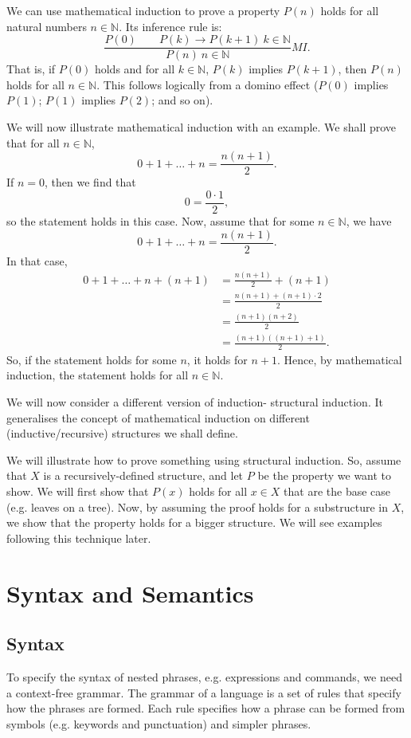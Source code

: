 \documentclass[a4paper, openany]{memoir}
\begin{document}
    We can use mathematical induction to prove a property $P(n)$ holds for all natural numbers $n \in \mathbb{N}$. Its inference rule is:
    \[\frac{P(0) \qquad P(k) \to P(k+1) \ k \in \mathbb{N}}{P(n) \ n \in \mathbb{N}} MI.\]
    That is, if $P(0)$ holds and for all $k \in \mathbb{N}$, $P(k)$ implies $P(k+1)$, then $P(n)$ holds for all $n \in \mathbb{N}$. This follows logically from a domino effect ($P(0)$ implies $P(1)$; $P(1)$ implies $P(2)$; and so on).

    We will now illustrate mathematical induction with an example. We shall prove that for all $n \in \mathbb{N}$,
    \[0 + 1 + \dots + n = \frac{n(n+1)}{2}.\]
    If $n = 0$, then we find that
    \[0 = \frac{0 \cdot 1}{2},\]
    so the statement holds in this case. Now, assume that for some $n \in \mathbb{N}$, we have
    \[0 + 1 + \dots + n = \frac{n(n+1)}{2}.\]
    In that case,
    \begin{align*}
        0 + 1 + \dots + n + (n+1) &= \frac{n(n+1)}{2} + (n+1) \\
        &= \frac{n(n+1) + (n+1) \cdot 2}{2} \\
        &= \frac{(n+1)(n+2)}{2} \\
        &= \frac{(n+1)((n+1) + 1)}{2}.
    \end{align*}
    So, if the statement holds for some $n$, it holds for $n+1$. Hence, by mathematical induction, the statement holds for all $n \in \mathbb{N}$.

    We will now consider a different version of induction- structural induction. It generalises the concept of mathematical induction on different (inductive/recursive) structures we shall define. 
    
    We will illustrate how to prove something using structural induction. So, assume that $X$ is a recursively-defined structure, and let $P$ be the property we want to show. We will first show that $P(x)$ holds for all $x \in X$ that are the base case (e.g. leaves on a tree). Now, by assuming the proof holds for a substructure in $X$, we show that the property holds for a bigger structure. We will see examples following this technique later.
    \newpage

    \section{Syntax and Semantics}
    \subsection{Syntax}
    To specify the syntax of nested phrases, e.g. expressions and commands, we need a context-free grammar. The grammar of a language is a set of rules that specify how the phrases are formed. Each rule specifies how a phrase can be formed from symbols (e.g. keywords and punctuation) and simpler phrases.
\end{document}
